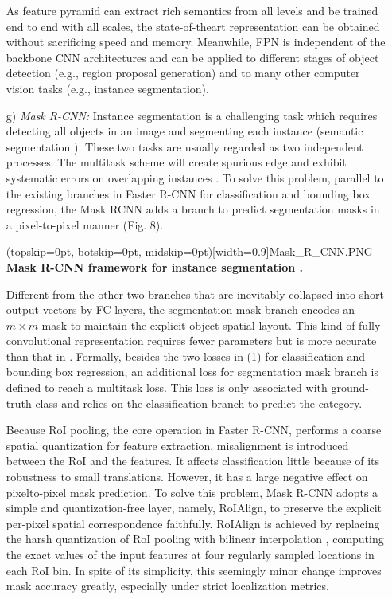 \documentclass[two column]{ieeeaccess}
\begin{document}
\begin{itemize}
    As feature pyramid can extract rich semantics from all levels and be trained end to end with all scales, the state-of-theart representation can be obtained without sacrificing speed and memory. Meanwhile, FPN is independent of the backbone CNN architectures and can be applied to different stages of object detection (e.g., region proposal generation) and to many other computer vision tasks (e.g., instance segmentation). \\
    
    
    \item[g)]\textit{Mask R-CNN: } Instance segmentation \cite{96} is a challenging task which requires detecting all objects in an image and segmenting each instance (semantic segmentation \cite{97}). These two tasks are usually regarded as two independent processes. The multitask scheme will create spurious edge and exhibit systematic errors on overlapping instances \cite{98}. To solve this problem, parallel to the existing branches in Faster R-CNN for classification and bounding box regression, the Mask RCNN \cite{67} adds a branch to predict segmentation masks in a pixel-to-pixel manner (Fig. 8). 
    
      \Figure[ht](topskip=0pt, botskip=0pt, midskip=0pt)[width=0.9\linewidth]{Mask_R_CNN.PNG} {\textbf{Mask R-CNN framework for instance segmentation \cite{67}.}\label{fig8}}
      
    Different from the other two branches that are inevitably collapsed into short output vectors by FC layers, the segmentation mask branch encodes an $m \times m$ mask to maintain the explicit object spatial layout. This kind of fully convolutional
    representation requires fewer parameters but is more accurate than that in \cite{}. Formally, besides the two losses in (1) for classification and bounding box regression, an additional loss for segmentation mask branch is defined to reach a multitask loss. This loss is only associated with ground-truth class and relies on the classification branch to predict the category. 
    
    Because RoI pooling, the core operation in Faster R-CNN, performs a coarse spatial quantization for feature extraction, misalignment is introduced between the RoI and the features. It affects classification little because of its robustness to small translations. However, it has a large negative effect on pixelto-pixel mask prediction. To solve this problem, Mask R-CNN adopts a simple and quantization-free layer, namely, RoIAlign, to preserve the explicit per-pixel spatial correspondence faithfully. RoIAlign is achieved by replacing the harsh quantization of RoI pooling with bilinear interpolation \cite{99}, computing the exact values of the input features at four regularly sampled locations in each RoI bin. In spite of its simplicity, this seemingly minor change improves mask accuracy greatly, especially under strict localization metrics. 
    

\end{itemize}
\end{document}
